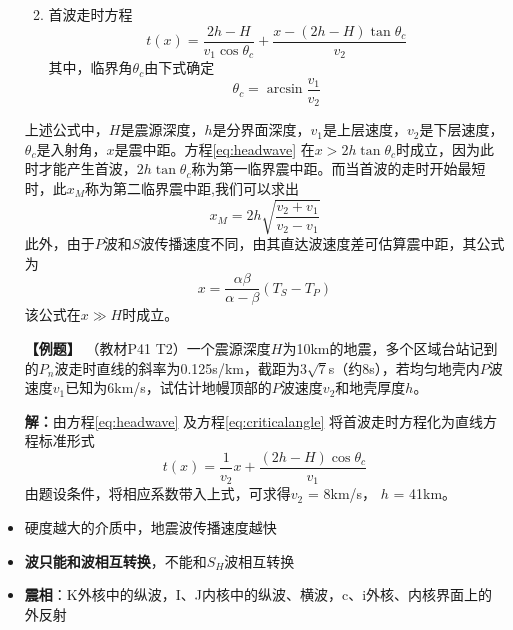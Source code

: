\documentclass[twoside,titlepage,hyperref,UTF8,12pt]{ctexart}
\begin{document}
\begin{itemize}
\begin{enumerate}
\begin{equation}
                \end{equation}
            \item 首波走时方程
                \begin{equation}\label{eq:headwave}
                    t(x) = \frac{2h-H}{v_1 \cos \theta_c} + \frac{x - (2h - H) \tan \theta_c}{v_2}
                \end{equation}
                其中，临界角$\theta_c$由下式确定
                \begin{equation}\label{eq:criticalangle}
                    \theta_c = \arcsin \frac{v_1}{v_2}
                \end{equation}
        \end{enumerate}
        上述公式中，$H$是震源深度，$h$是分界面深度，$v_1$是上层速度，$v_2$是下层速度，$\theta_c$是入射角，$x$是震中距。方程\ref{eq:headwave} 在$x > 2h \tan \theta_c$时成立，因为此时才能产生首波，$2h\tan\theta_c$称为第一临界震中距。而当首波的走时开始最短时，此$x_M$称为第二临界震中距,我们可以求出
        \begin{equation}
            x_M = 2h \sqrt{\frac{v_2 + v_1}{v_2 - v_1}}
        \end{equation}
        此外，由于$P$波和$S$波传播速度不同，由其直达波速度差可估算震中距，其公式为
        \begin{equation}\label{eq:epicentraldistance}
            x = \frac{\alpha \beta}{\alpha - \beta} (T_S - T_P)
        \end{equation}
        该公式在$x \gg H$时成立。

        \textbf{【例题】} （教材P41 T2）一个震源深度$H$为10km的地震，多个区域台站记到的$P_n$波走时直线的斜率为0.125s/km，截距为$3\sqrt{7}$s（约8s），若均匀地壳内$P$波速度$v_1$已知为6km/s，试估计地幔顶部的$P$波速度$v_2$和地壳厚度$h$。

        \textbf{解：}由方程\ref{eq:headwave} 及方程\ref{eq:criticalangle} 将首波走时方程化为直线方程标准形式
        \begin{equation}
            t(x) = \frac{1}{v_2} x + \frac{(2h - H)\cos \theta_c}{v_1}
        \end{equation}
        由题设条件，将相应系数带入上式，可求得$v_2$ = 8km/s， $h$ = 41km。
    \item 硬度越大的介质中，地震波传播速度越快
    \item \textbf{波只能和波相互转换}，不能和$S_H$波相互转换
    \item \textbf{震相}：K外核中的纵波，I、J内核中的纵波、横波，c、i外核、内核界面上的外反射
\end{itemize}
\end{document}
